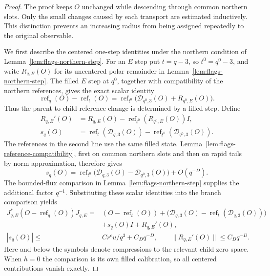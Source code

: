 \begin{proof}
The proof keeps $O$ unchanged while descending through common northern
slots.  Only the small changes caused by each transport are estimated
inductively.  This distinction prevents an increasing radius from
being assigned repeatedly to the original observable.

We first describe the centered one-step identities under the northern
condition of Lemma~\ref{lem:flags-northern-step}.  For an $E$ step
put $t=q-3$, so $t^0=q^0-3$, and write $R_{q,E}(O)$ for its uncentered
polar remainder in Lemma~\ref{lem:flags-northern-step}.  The filled
$E$ step at $q^0$, together with compatibility of the northern
references, gives the exact scalar identity
\[
 \operatorname{ref}_q(O)-\operatorname{ref}_t(O)
 =\operatorname{ref}_{t^0}\bigl(
     \mathcal D_{q^0,3}(O)+R_{q^0,E}(O)\bigr).
\]
Thus the parent-to-child reference change is determined by a filled
step.  Define
\[
 \begin{split}
 R_{q,E}'(O)&=R_{q,E}(O)
           -\operatorname{ref}_{t^0}(R_{q^0,E}(O))I,\\
 s_q(O)&=\operatorname{ref}_t(\mathcal D_{q,3}(O))
         -\operatorname{ref}_{t^0}(\mathcal D_{q^0,3}(O)).
 \end{split}
\]
The references in the second line use the same filled state.
Lemma~\ref{lem:flags-reference-compatibility}, first on common northern
slots and then on rapid tails by norm approximation, therefore gives
\[
 s_q(O)=\operatorname{ref}_{t^0}\bigl(
     \mathcal D_{q,3}(O)-\mathcal D_{q^0,3}(O)\bigr)
     +O(q^{-D}).
\]
The bounded-flux comparison in Lemma~\ref{lem:flags-northern-step}
supplies the additional factor $q^{-1}$.  Substituting these scalar
identities into the branch comparison yields
\begin{equation}
 \begin{split}
 J_{q,E}^*(O-\operatorname{ref}_q(O))J_{q,E}
 ={}&(O-\operatorname{ref}_t(O))
    +\bigl(\mathcal D_{q,3}(O)
               -\operatorname{ref}_t(\mathcal D_{q,3}(O))\bigr)\\
    &+s_q(O)I+R_{q,E}'(O),\\
 |s_q(O)|\leq{}&Cr^c u/q^3+C_Dq^{-D},\qquad
 \|R_{q,E}'(O)\|\leq C_Dq^{-D}.
 \end{split}
 \label{eq:flags-centered-E}
\end{equation}
Here and below the symbols denote compressions to the relevant child
zero space.  When $h=0$ the comparison is its own filled calibration,
so all centered contributions vanish exactly.


\end{proof}
